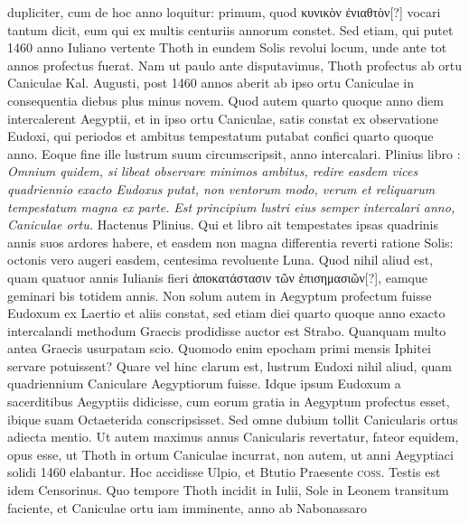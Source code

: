 dupliciter, cum de hoc anno loquitur: primum, quod \textgreek{κυνικὸν
ἐνιαθτὸν}[?] vocari tantum dicit, eum qui ex multis centuriis annorum
constet.
Sed etiam, qui putet 1460 anno Iuliano vertente Thoth in
eundem Solis revolui locum, unde ante tot annos profectus fuerat.
Nam ut paulo ante disputavimus, Thoth profectus ab ortu Caniculae
Kal. Augusti, post 1460 annos aberit ab ipso ortu Caniculae in consequentia
diebus plus minus novem.
Quod autem quarto quoque
anno diem intercalerent Aegyptii, et in ipso ortu Caniculae, satis
constat ex observatione Eudoxi, qui periodos et ambitus tempestatum
putabat confici quarto quoque anno.
Eoque fine ille lustrum
suum circumscripsit, anno intercalari.
Plinius libro : \textit{Omnium
quidem, si libeat observare minimos ambitus, redire easdem vices quadriennio
exacto Eudoxus putat, non ventorum modo, verum et reliquarum
tempestatum magna ex parte.}
\textit{Est principium lustri eius semper intercalari
anno, Caniculae ortu.}
Hactenus Plinius.
Qui et libro  ait tempestates
ipsas quadrinis annis suos ardores habere, et easdem non magna
differentia reverti ratione Solis: octonis vero augeri easdem, centesima
revoluente Luna.
Quod nihil aliud est, quam quatuor annis Iulianis
fieri \textgreek{ἀποκατάστασιν τῶν ἐπισημασιῶν}[?], eamque geminari bis totidem
annis.
%
Non solum autem in Aegyptum profectum fuisse Eudoxum
ex Laertio et aliis constat, sed etiam diei quarto quoque anno
exacto intercalandi methodum Graecis prodidisse auctor est Strabo.
Quanquam multo antea Graecis usurpatam scio.
Quomodo enim
epocham primi mensis Iphitei servare potuissent?
Quare vel hinc
clarum est, lustrum Eudoxi nihil aliud, quam quadriennium Caniculare
Aegyptiorum fuisse.
Idque ipsum Eudoxum a sacerditibus
Aegyptiis didicisse, cum eorum gratia in Aegyptum profectus esset,
ibique suam Octaeterida conscripsisset.
Sed omne dubium tollit Canicularis
ortus adiecta mentio.
Ut autem maximus annus Canicularis
revertatur, fateor equidem, opus esse, ut Thoth in ortum Caniculae
incurrat, non autem, ut anni Aegyptiaci solidi 1460 elabantur.
Hoc accidisse Ulpio, et Btutio Praesente \textsc{coss}.
Testis est idem Censorinus.
Quo tempore Thoth incidit in  Iulii, Sole in Leonem transitum
faciente, et Caniculae ortu iam imminente, anno ab %
 Nabonassaro
